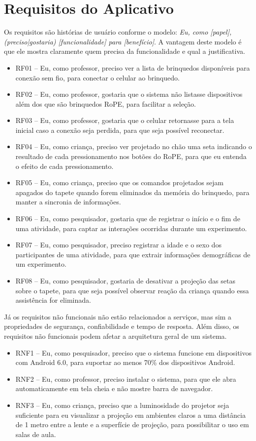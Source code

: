 \chapter{Requisitos do Aplicativo}
\label{apendice_b}
Os requisitos são histórias de usuário conforme o modelo:
	\textit{Eu, como [papel], (preciso|gostaria) [funcionalidade] para [benefício]}.
A vantagem deste modelo é que ele mostra claramente quem precisa da funcionalidade e qual a justificativa. 

\begin{itemize}
\item RF01 – Eu, como professor, preciso ver a lista de brinquedos disponíveis para conexão sem fio, para conectar o celular ao brinquedo.
\item RF02 – Eu, como professor, gostaria que o sistema não listasse dispositivos além dos que são brinquedos RoPE, para facilitar a seleção.
\item RF03 – Eu, como professor, gostaria que o celular retornasse para a tela inicial caso a conexão seja perdida, para que seja possível reconectar.
\item RF04 – Eu, como criança, preciso ver projetado no chão uma seta indicando o resultado de cada pressionamento nos botões do RoPE, para que eu entenda o efeito de cada pressionamento.
\item RF05 – Eu, como criança, preciso que os comandos projetados sejam apagados do tapete quando forem eliminados da memória do brinquedo, para manter a sincronia de informações.
\item RF06 – Eu, como pesquisador, gostaria que de registrar o início e o fim de uma atividade, para captar as interações ocorridas durante um experimento. 
\item RF07 – Eu, como pesquisador, preciso registrar a idade e o sexo dos participantes de uma atividade, para que extrair informações demográficas de um experimento.
\item RF08 – Eu, como pesquisador, gostaria de desativar a projeção das setas sobre o tapete, para que seja possível observar reação da criança quando essa assistência for eliminada.

\end{itemize}

Já os requisitos não funcionais não estão relacionados a serviços, mas sim a propriedades de segurança, confiabilidade e tempo de resposta. Além disso, os requisitos não funcionais podem afetar a arquitetura geral de um sistema.

\begin{itemize}
    \item RNF1 – Eu, como pesquisador, preciso que o sistema funcione em dispositivos com Android 6.0, para suportar ao menos 70\% dos dispositivos Android.
    \item RNF2 – Eu, como professor, preciso instalar o sistema, para que ele abra automaticamente em tela cheia e não mostre barra de navegador.
    \item RNF3 – Eu, como criança, preciso que a luminosidade do projetor seja suficiente para eu visualizar a projeção em ambientes claros a uma distância de 1 metro entre a lente e a superfície de projeção, para possibilitar o uso em salas de aula.
\end{itemize}